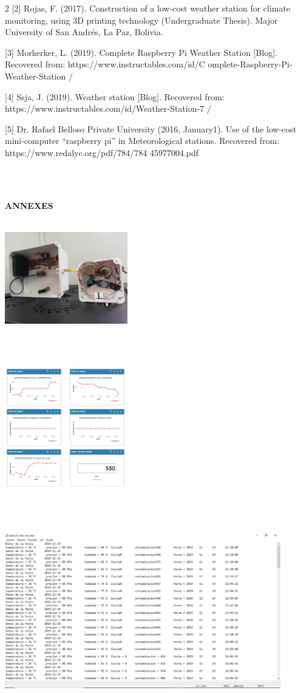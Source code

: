 \documentclass{article}
\begin{document}
\begin{multicols} {2}
[2] Rojas, F. (2017). Construction of a low-cost weather station for climate monitoring, using 3D printing technology (Undergraduate Thesis). Major University of San Andrés, La Paz, Bolivia.

[3] Morkerker, L. (2019). Complete Raspberry Pi Weather Station [Blog]. Recovered from: https://www.instructables.com/id/C
omplete-Raspberry-Pi-Weather-Station /

[4] Ssja, J. (2019). Weather station [Blog]. Recovered from: https://www.instructables.com/id/Weather-Station-7 /

[5] Dr. Rafael Belloso Private University (2016, January1). Use of the low-cost mini-computer “raspberry pi” in Meteorological stations. Recovered from: https://www.redalyc.org/pdf/784/784
45977004.pdf

\end{multicols}
\\\\
\begin{center}
\textbf{ANNEXES}
\end{center}
\begin{center}
\\
\includegraphics[width=0.4\textwidth]{ANEXO1.jpeg}
\end{center}
\\
\begin{center}
\\
\includegraphics[width=0.4\textwidth]{grafico.jpg}
\end{center}
\\
\begin{center}
\\
\includegraphics[width=0.9\textwidth]{diagrama.jpeg}
\end{center}
\end{document}
